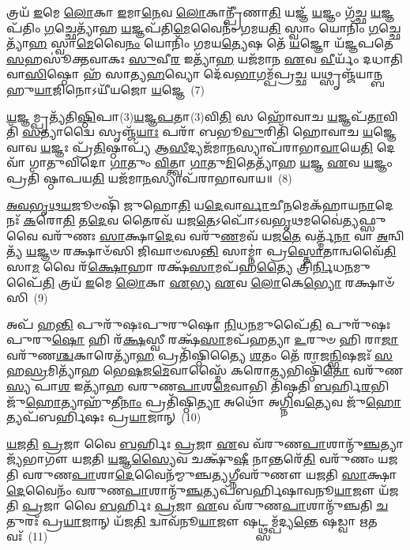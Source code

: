 𑌤𑍍𑌰𑌯᳴ \ul{𑌇}\-𑌮𑍇 \ul{𑌲𑍋}\-𑌕𑌾 \ul{𑌇}\-𑌮𑌾\-\ul{𑌨𑍇}\-𑌵 \ul{𑌲𑍋}\-𑌕𑌾𑌨𑍍𑌪𑍍𑌰𑍀᳴𑌣𑌾\-\ul{𑌤𑌿} 𑌯𑌜𑍍𑌞᳴ \ul{𑌯}\-𑌜𑍍𑌞𑌂 𑌗᳴𑌚𑍍𑌛 \ul{𑌯}\-𑌜𑍍𑌞𑌪᳴𑌤𑌿𑌂 \ul{𑌗}\-𑌚𑍍𑌛𑍇𑌤𑍍𑌯𑌾᳴𑌹 \ul{𑌯}\-𑌜𑍍𑌞𑌪᳴𑌤𑌿\-\ul{𑌮𑍇}\-𑌵𑍈𑌨𑌂᳴ 𑌗𑌮𑌯\-\ul{𑌤𑌿} 𑌸𑍍𑌵𑌾𑌂 𑌯𑍋𑌨𑌿𑌂᳴ \ul{𑌗}\-𑌚𑍍𑌛𑍇𑌤𑍍𑌯𑌾᳴\-\ul{𑌹} 𑌸𑍍𑌵𑌾\-\ul{𑌮𑍇}\-𑌵𑍈\-\ul{𑌨𑌂} 𑌯𑍋𑌨𑌿𑌂᳴ 𑌗𑌮𑌯\-\ul{𑌤𑍍𑌯𑍇}\-𑌷 𑌤𑍇᳴ \ul{𑌯}\-𑌜𑍍𑌞𑍋 𑌯᳴𑌜𑍍𑌞𑌪𑌤𑍇 \ul{𑌸}\-𑌹𑌸𑍂॑𑌕𑍍𑌤𑌵𑌾𑌕𑌃 \ul{𑌸𑍁}\-𑌵𑍀\-\ul{𑌰} 𑌇𑌤𑍍𑌯𑌾᳴\-\ul{𑌹} 𑌯𑌜᳴𑌮𑌾𑌨 \ul{𑌏}\-𑌵 \ul{𑌵𑍀}\-𑌰𑍍𑌯𑌂᳴ 𑌦𑌧𑌾𑌤𑌿 𑌵𑌾\-\ul{𑌸𑌿}\-𑌷𑍍𑌠𑍋 𑌹᳴ 𑌸𑌾𑌤𑍍𑌯\-\ul{𑌹}\-𑌵𑍍𑌯𑍋 𑌦𑍇᳴𑌵\-\ul{𑌭𑌾}\-𑌗𑌮𑍍𑌪᳴𑌪𑍍𑌰\-\ul{𑌚𑍍𑌛} 𑌯𑌥𑍍𑌸𑍃𑌞𑍍𑌜᳴𑌯𑌾𑌨𑍍𑌬𑌹𑍁\-\ul{𑌯𑌾}\-𑌜𑌿𑌨𑍋\-𑌽𑌯𑍀᳴𑌯𑌜𑍋 \ul{𑌯}\-𑌜𑍍𑌞𑍇~(7)

\-\ul{𑌯}\-𑌜𑍍𑌞𑌮𑍍𑌪𑍍𑌰𑌤𑍍𑌯᳴𑌤𑌿\-\ul{𑌷𑍍𑌠𑌿}\-𑌪𑌾(3)\-\ul{𑌯}\-𑌜𑍍𑌞\-\ul{𑌪}\-𑌤𑌾(3)𑌵𑌿\-\ul{𑌤𑌿} 𑌸 𑌹𑍋᳴𑌵𑌾𑌚 \ul{𑌯}\-𑌜𑍍𑌞𑌪᳴\-\ul{𑌤𑌾}\-𑌵𑌿𑌤𑌿᳴ \ul{𑌸}\-𑌤𑍍𑌯𑌾𑌦𑍍𑌵𑍈 𑌸𑍃𑌞𑍍𑌜᳴\-\ul{𑌯𑌾𑌃} 𑌪𑌰𑌾᳴ 𑌬𑌭𑍂\-\ul{𑌵𑍁}\-𑌰𑌿𑌤𑌿᳴ 𑌹𑍋𑌵𑌾𑌚 \ul{𑌯}\-𑌜𑍍𑌞𑍇 𑌵𑌾𑌵 \ul{𑌯}\-𑌜𑍍𑌞𑌃 𑌪𑍍𑌰᳴\-\ul{𑌤𑌿}\-𑌷𑍍𑌠𑌾𑌪𑍍𑌯᳴ 𑌆\-\ul{𑌸𑍀}\-𑌦𑍍𑌯𑌜᳴𑌮𑌾\-\ul{𑌨}\-𑌸𑍍𑌯𑌾𑌪᳴𑌰𑌾𑌭𑌾\-\ul{𑌵𑌾}\-𑌯𑍇\-\ul{𑌤𑌿} 𑌦𑍇𑌵𑌾᳴ 𑌗𑌾𑌤𑍁𑌵𑌿𑌦𑍋 \ul{𑌗𑌾}\-𑌤𑍁𑌂 \ul{𑌵𑌿}\-𑌤𑍍𑌤𑍍𑌵𑌾 \ul{𑌗𑌾}\-𑌤𑍁\-\ul{𑌮𑌿}\-𑌤𑍇𑌤𑍍𑌯𑌾᳴𑌹 \ul{𑌯}\-𑌜𑍍𑌞 \ul{𑌏}\-𑌵 \ul{𑌯}\-𑌜𑍍𑌞𑌂 𑌪𑍍𑌰𑌤𑌿᳴ 𑌷𑍍𑌠𑌾𑌪𑌯\-\ul{𑌤𑌿} 𑌯𑌜᳴𑌮𑌾\-\ul{𑌨}\-𑌸𑍍𑌯𑌾𑌪᳴𑌰𑌾𑌭𑌾𑌵𑌾𑌯॥~(8)

{\anuvakamend[{𑌯𑌜𑍂𑍞᳴𑌷𑌿 \ul{𑌯}\-𑌜𑍍𑌞 𑌏𑌕᳴𑌚𑌤𑍍𑌵𑌾𑌰𑌿𑍞𑌶𑌚𑍍𑌚}]}%

\-\ul{𑌅}\-\-\ul{𑌵}\-\-\ul{𑌭𑍃}\-\-\ul{𑌥}\-\-\ul{𑌯}\-𑌜𑍂𑍞𑌷𑌿᳴ 𑌜𑍁𑌹𑍋\-\ul{𑌤𑌿} 𑌯\-\ul{𑌦𑍇}\-𑌵𑌾\-\ul{𑌰𑍍𑌵𑌾}\-𑌚𑍀\-\ul{𑌨}\-𑌮𑍇𑌕᳴𑌹𑌾𑌯\-\ul{𑌨𑌾}\-𑌦𑍇𑌨𑌃᳴ \ul{𑌕}\-𑌰𑍋\-\ul{𑌤𑌿} 𑌤\-\ul{𑌦𑍇}\-𑌵 𑌤𑍈𑌰𑌵᳴ 𑌯𑌜\-\ul{𑌤𑍇}\-\-𑌽𑌪𑍋᳴\-𑌽𑌵\-\ul{𑌭𑍃}\-𑌥𑌮𑌵𑍈॑\-\ul{𑌤𑍍𑌯}\-𑌫𑍍𑌸𑍁 𑌵𑍈 𑌵𑌰𑍁᳴𑌣𑌃 \ul{𑌸𑌾}\-𑌕𑍍𑌷𑌾\-\ul{𑌦𑍇}\-𑌵 𑌵𑌰𑍁᳴\-\ul{𑌣}\-𑌮𑌵᳴ 𑌯𑌜\-\ul{𑌤𑍇} 𑌵𑌰𑍍𑌤𑍍𑌮᳴\-\ul{𑌨𑌾} 𑌵𑌾 \ul{𑌅}\-𑌨𑍍𑌵𑌿𑌤𑍍𑌯᳴ \ul{𑌯}\-𑌜𑍍𑌞𑍞 𑌰𑌕𑍍𑌷𑌾𑍞᳴𑌸𑌿 𑌜𑌿𑌘𑌾𑍞𑌸\-\ul{𑌨𑍍𑌤𑌿} 𑌸𑌾𑌮𑍍𑌨𑌾॑ 𑌪𑍍𑌰\-\ul{𑌸𑍍𑌤𑍋}\-𑌤𑌾𑌨𑍍𑌵𑌵𑍈᳴\-\ul{𑌤𑌿} 𑌸𑌾\-\ul{𑌮} 𑌵𑍈 𑌰᳴\-\ul{𑌕𑍍𑌷𑍋}\-𑌹𑌾 𑌰𑌕𑍍𑌷᳴\-\ul{𑌸𑌾}\-𑌮𑌪᳴𑌹\-\ul{𑌤𑍍𑌯𑍈} 𑌤𑍍𑌰𑌿\-\ul{𑌰𑍍𑌨𑌿}\-𑌧\-\ul{𑌨}\-𑌮𑍁𑌪𑍈᳴\-\ul{𑌤𑌿} 𑌤𑍍𑌰𑌯᳴ \ul{𑌇}\-𑌮𑍇 \ul{𑌲𑍋}\-𑌕𑌾 \ul{𑌏}\-𑌭𑍍𑌯 \ul{𑌏}\-𑌵 \ul{𑌲𑍋}\-𑌕𑍇\-\ul{𑌭𑍍𑌯𑍋} 𑌰𑌕𑍍𑌷𑌾𑍞᳴𑌸𑌿~(9)

𑌅𑌪᳴ 𑌹\-\ul{𑌨𑍍𑌤𑌿} 𑌪𑍁𑌰𑍁᳴𑌷𑌃𑌪𑍁𑌰𑍁𑌷𑍋 \ul{𑌨𑌿}\-𑌧\-\ul{𑌨}\-𑌮𑍁𑌪𑍈᳴\-\ul{𑌤𑌿} 𑌪𑍁𑌰𑍁᳴𑌷𑌃𑌪𑍁𑌰𑍁\-\ul{𑌷𑍋} 𑌹𑌿 𑌰᳴\-\ul{𑌕𑍍𑌷}\-𑌸𑍍𑌵𑍀 𑌰𑌕𑍍𑌷᳴\-\ul{𑌸𑌾}\-𑌮𑌪᳴𑌹𑌤𑍍𑌯𑌾 \ul{𑌉}\-𑌰𑍁𑍞 𑌹𑌿 𑌰𑌾\-\ul{𑌜𑌾} 𑌵𑌰𑍁᳴𑌣\-\ul{𑌶𑍍𑌚}\-𑌕𑌾𑌰𑍇𑌤𑍍𑌯𑌾᳴\-\ul{𑌹} 𑌪𑍍𑌰𑌤𑌿᳴𑌷𑍍𑌠𑌿𑌤𑍍𑌯𑍈 \ul{𑌶}\-𑌤𑌂 𑌤𑍇᳴ 𑌰𑌾𑌜\-\ul{𑌨𑍍𑌭𑌿}\-𑌷𑌜𑌃᳴ \ul{𑌸}\-𑌹\-\ul{𑌸𑍍𑌰}\-𑌮𑌿𑌤𑍍𑌯𑌾᳴𑌹 𑌭𑍇\-\ul{𑌷}\-𑌜\-\ul{𑌮𑍇}\-𑌵𑌾𑌸𑍍𑌮𑍈᳴ 𑌕𑌰𑍋\-\ul{𑌤𑍍𑌯}\-𑌭𑌿𑌷𑍍𑌠𑌿᳴\-\ul{𑌤𑍋} 𑌵𑌰𑍁᳴𑌣\-\ul{𑌸𑍍𑌯} 𑌪𑌾\-\ul{𑌶} 𑌇𑌤𑍍𑌯𑌾᳴𑌹 𑌵𑌰𑍁𑌣\-\ul{𑌪𑌾}\-𑌶\-\ul{𑌮𑍇}\-𑌵𑌾𑌭𑌿 𑌤𑌿᳴𑌷𑍍𑌠𑌤𑌿 \ul{𑌬}\-𑌰𑍍\mbox{}𑌹𑌿\-\ul{𑌰}\-𑌭𑌿 𑌜𑍁᳴\-\ul{𑌹𑍋}\-𑌤𑍍𑌯𑌾𑌹𑍁᳴𑌤𑍀\-\ul{𑌨𑌾𑌂} 𑌪𑍍𑌰𑌤𑌿᳴𑌷𑍍𑌠𑌿\-\ul{𑌤𑍍𑌯𑌾} 𑌅𑌥𑍋᳴ 𑌅\-\ul{𑌗𑍍𑌨𑌿}\-𑌵\-\ul{𑌤𑍍𑌯𑍇}\-𑌵 𑌜𑍁᳴\-\ul{𑌹𑍋}\-𑌤𑍍𑌯𑌪᳴𑌬𑌰𑍍\mbox{}𑌹𑌿𑌷𑌃 𑌪𑍍𑌰\-\ul{𑌯𑌾}\-𑌜𑌾𑌨𑍍~(10)

\-\ul{𑌯}\-\-\ul{𑌜}\-\-\ul{𑌤𑌿} \ul{𑌪𑍍𑌰}\-𑌜𑌾 𑌵𑍈 \ul{𑌬}\-𑌰𑍍\mbox{}𑌹𑌿𑌃 \ul{𑌪𑍍𑌰}\-𑌜𑌾 \ul{𑌏}\-𑌵 𑌵᳴𑌰𑍁𑌣\-\ul{𑌪𑌾}\-𑌶𑌾𑌨𑍍𑌮𑍁᳴\-\ul{𑌞𑍍𑌚}\-𑌤𑍍𑌯𑌾𑌜𑍍𑌯᳴𑌭𑌾𑌗𑍗 𑌯𑌜𑌤𑌿 \ul{𑌯}\-𑌜𑍍𑌞\-\ul{𑌸𑍍𑌯𑍈}\-𑌵 𑌚𑌕𑍍𑌷𑍁᳴\-\ul{𑌷𑍀} 𑌨𑌾𑌨𑍍𑌤𑌰𑍇᳴\-\ul{𑌤𑌿} 𑌵𑌰𑍁᳴𑌣𑌂 𑌯𑌜𑌤𑌿 𑌵𑌰𑍁𑌣\-\ul{𑌪𑌾}\-𑌶𑌾\-\ul{𑌦𑍇}\-𑌵𑍈𑌨᳴𑌮𑍍𑌮𑍁𑌞𑍍𑌚\-\ul{𑌤𑍍𑌯}\-𑌗𑍍𑌨𑍀𑌵𑌰𑍁᳴𑌣𑍗 𑌯𑌜𑌤𑌿 \ul{𑌸𑌾}\-𑌕𑍍𑌷𑌾\-\ul{𑌦𑍇}\-𑌵𑍈𑌨𑌂᳴ 𑌵𑌰𑍁𑌣\-\ul{𑌪𑌾}\-𑌶𑌾𑌨𑍍𑌮𑍁᳴\-\ul{𑌞𑍍𑌚}\-𑌤𑍍𑌯𑌪᳴𑌬𑌰𑍍\mbox{}𑌹𑌿𑌷𑌾𑌵𑌨𑍂\-\ul{𑌯𑌾}\-𑌜𑍗 𑌯᳴𑌜𑌤𑌿 \ul{𑌪𑍍𑌰}\-𑌜𑌾 𑌵𑍈 \ul{𑌬}\-𑌰𑍍\mbox{}𑌹𑌿𑌃 \ul{𑌪𑍍𑌰}\-𑌜𑌾 \ul{𑌏}\-𑌵 𑌵᳴𑌰𑍁𑌣\-\ul{𑌪𑌾}\-𑌶𑌾𑌨𑍍𑌮𑍁᳴𑌞𑍍𑌚𑌤𑌿 \ul{𑌚}\-𑌤𑍁𑌰𑌃᳴ 𑌪𑍍𑌰\-\ul{𑌯𑌾}\-𑌜𑌾𑌨𑍍 𑌯᳴𑌜\-\ul{𑌤𑌿} 𑌦𑍍𑌵𑌾𑌵᳴𑌨𑍂\-\ul{𑌯𑌾}\-𑌜𑍗 𑌷𑌟𑍍𑌥𑍍𑌸𑌮𑍍𑌪᳴𑌦𑍍𑌯\-\ul{𑌨𑍍𑌤𑍇} 𑌷𑌡𑍍𑌵𑌾 \ul{𑌋}\-𑌤𑌵𑌃᳴~(11)

